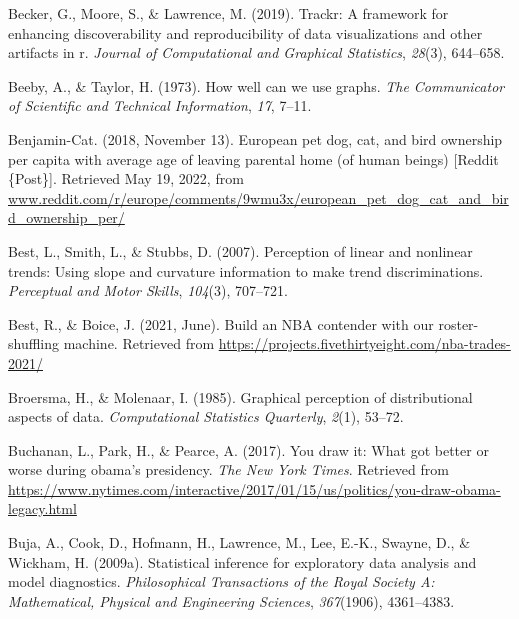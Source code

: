 \documentclass[print]{nuthesis}
\newlength{\cslhangindent}
\newenvironment{CSLReferences}[2]%
{\setlength{\parindent}{0pt}%
\everypar{\setlength{\hangindent}{\cslhangindent}}\ignorespaces}%
{\par}
\begin{document}
\begin{CSLReferences}{1}{0}
\leavevmode{}%
Becker, G., Moore, S., \& Lawrence, M. (2019). Trackr: A framework for enhancing discoverability and reproducibility of data visualizations and other artifacts in r. \emph{Journal of Computational and Graphical Statistics}, \emph{28}(3), 644--658.

\leavevmode{}%
Beeby, A., \& Taylor, H. (1973). How well can we use graphs. \emph{The Communicator of Scientific and Technical Information}, \emph{17}, 7--11.

\leavevmode{}%
Benjamin-Cat. (2018, November 13). European pet dog, cat, and bird ownership per capita with average age of leaving parental home (of human beings) {[}Reddit \{Post\}{]}. Retrieved May 19, 2022, from \href{https://www.reddit.com/r/europe/comments/9wmu3x/european_pet_dog_cat_and_bird_ownership_per/}{www.reddit.com/r/europe/comments/9wmu3x/european\_pet\_dog\_cat\_and\_bird\_ownership\_per/}

\leavevmode{}%
Best, L., Smith, L., \& Stubbs, D. (2007). Perception of linear and nonlinear trends: Using slope and curvature information to make trend discriminations. \emph{Perceptual and Motor Skills}, \emph{104}(3), 707--721.

\leavevmode{}%
Best, R., \& Boice, J. (2021, June). Build an NBA contender with our roster-shuffling machine. Retrieved from \url{https://projects.fivethirtyeight.com/nba-trades-2021/}

\leavevmode{}%
Broersma, H., \& Molenaar, I. (1985). Graphical perception of distributional aspects of data. \emph{Computational Statistics Quarterly}, \emph{2}(1), 53--72.

\leavevmode{}%
Buchanan, L., Park, H., \& Pearce, A. (2017). You draw it: What got better or worse during obama's presidency. \emph{The New York Times}. Retrieved from \url{https://www.nytimes.com/interactive/2017/01/15/us/politics/you-draw-obama-legacy.html}

\leavevmode{}%
Buja, A., Cook, D., Hofmann, H., Lawrence, M., Lee, E.-K., Swayne, D., \& Wickham, H. (2009a). Statistical inference for exploratory data analysis and model diagnostics. \emph{Philosophical Transactions of the Royal Society A: Mathematical, Physical and Engineering Sciences}, \emph{367}(1906), 4361--4383.


\end{CSLReferences}
\end{document}
